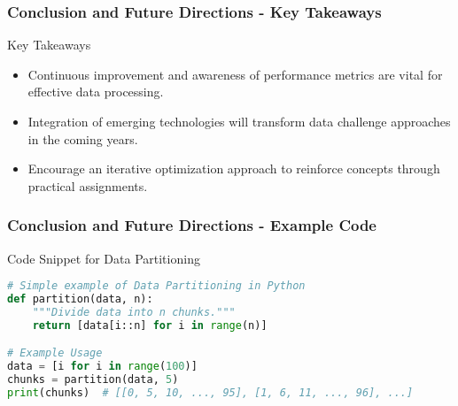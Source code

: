 \documentclass[aspectratio=169]{beamer}
\begin{document}
\begin{frame}[fragile]
    \frametitle{Conclusion and Future Directions - Key Takeaways}
    \begin{block}{Key Takeaways}
        \begin{itemize}
            \item Continuous improvement and awareness of performance metrics are vital for effective data processing.
            \item Integration of emerging technologies will transform data challenge approaches in the coming years.
            \item Encourage an iterative optimization approach to reinforce concepts through practical assignments.
        \end{itemize}
    \end{block}
\end{frame}

\begin{frame}
    \frametitle{Conclusion and Future Directions - Example Code}
    \begin{block}{Code Snippet for Data Partitioning}
    \begin{lstlisting}[language=Python]
# Simple example of Data Partitioning in Python
def partition(data, n):
    """Divide data into n chunks."""
    return [data[i::n] for i in range(n)]

# Example Usage
data = [i for i in range(100)]
chunks = partition(data, 5)
print(chunks)  # [[0, 5, 10, ..., 95], [1, 6, 11, ..., 96], ...]
    \end{lstlisting}
    \end{block}
\end{frame}
\end{document}

